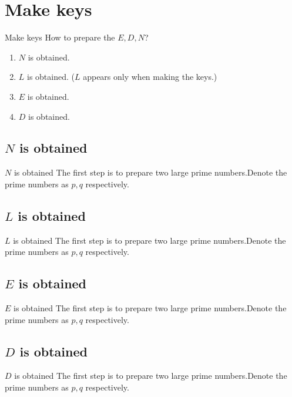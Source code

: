 \documentclass[dvipdfmx]{beamer}
\begin{document}
\section{Make keys}
\begin{frame}{Make keys}
    How to prepare the \(E,D,N\)?
    \begin{enumerate}
        \item \(N\) is obtained.
        \item \(L\) is obtained. (\(L\) appears only when making the keys.)
        \item \(E\) is obtained.
        \item \(D\) is obtained.
    \end{enumerate}
\end{frame}
\subsection{\(N\) is obtained}
\begin{frame}{\(N\) is obtained}
    The first step is to prepare two large prime numbers.Denote the prime numbers as \(p,q\) respectively.
\end{frame}

\subsection{\(L\) is obtained}
\begin{frame}{\(L\) is obtained}
    The first step is to prepare two large prime numbers.Denote the prime numbers as \(p,q\) respectively.
\end{frame}

\subsection{\(E\) is obtained}
\begin{frame}{\(E\) is obtained}
    The first step is to prepare two large prime numbers.Denote the prime numbers as \(p,q\) respectively.
\end{frame}

\subsection{\(D\) is obtained}
\begin{frame}{\(D\) is obtained}
    The first step is to prepare two large prime numbers.Denote the prime numbers as \(p,q\) respectively.
\end{frame}
\end{document}
